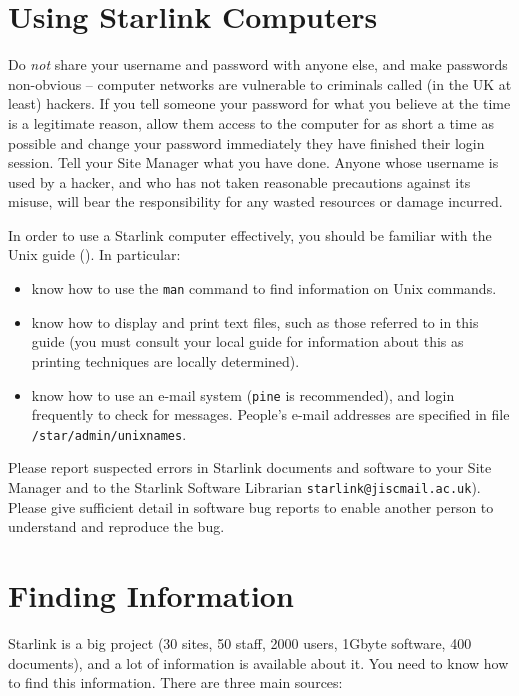\documentclass[twoside,11pt,nolof]{starlink}
\begin{document}
\newpage

\section{Using Starlink Computers}

Do \emph{not}\/ share your username and password with anyone else, and make
passwords non-obvious -- computer networks are vulnerable to criminals called
(in the UK at least) hackers.
If you tell someone your password for what you believe at the time is a
legitimate reason, allow them access to the computer for as short a time as
possible and change your password immediately they have finished their login
session.
Tell your Site Manager what you have done.
Anyone whose username is used by a hacker, and who has not taken reasonable
precautions against its misuse, will bear the responsibility for any wasted
resources or damage incurred.

In order to use a Starlink computer effectively, you should be familiar
with the Unix guide
().
In particular:

\begin{itemize}
\item know how to use the \texttt{man} command to find information on Unix
commands.
\item know how to display and print text files, such as those referred to in
this guide (you must consult your local guide for information about this
as printing techniques are locally determined).
\item know how to use an e-mail system (\texttt{pine} is recommended), and login
frequently to check for messages.
People's e-mail addresses are specified in file \texttt{/star/admin/unixnames}.
\end{itemize}

Please report suspected errors in Starlink documents and software to your Site
Manager and to the Starlink Software Librarian \texttt{starlink@jiscmail.ac.uk}).
Please give sufficient detail in software bug reports to enable another person
to understand and reproduce the bug.

\newpage

\section{Finding Information}

Starlink is a big project (30 sites, 50 staff, 2000 users, 1Gbyte software,
400 documents), and a lot of information is available about it.
You need to know how to find this information.
There are three main sources:
\end{document}
